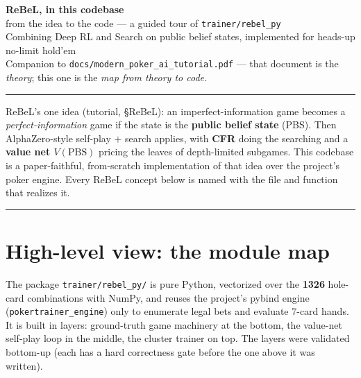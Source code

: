\documentclass[11pt,a4paper]{article}
\newcommand{\file}[1]{\textcolor{accent}{\texttt{#1}}}
\begin{document}
\begin{center}
  {\Huge\bfseries ReBeL, in this codebase}\\[2mm]
  {\large from the idea to the code --- a guided tour of \texttt{trainer/rebel\_py}}\\[3mm]
  {\normalsize Combining Deep RL and Search on public belief states, implemented for
   heads-up no-limit hold'em}\\[2mm]
  {\small Companion to \texttt{docs/modern\_poker\_ai\_tutorial.pdf} --- that document
   is the \emph{theory}; this one is the \emph{map from theory to code}.}
\end{center}
\vspace{2mm}
\hrule
\vspace{3mm}

\begin{intuition}
ReBeL's one idea (tutorial, §ReBeL): an imperfect-information game becomes a
\emph{perfect-information} game if the state is the \textbf{public belief state}
(PBS). Then AlphaZero-style self-play $+$ search applies, with \textbf{CFR}
doing the searching and a \textbf{value net $V(\text{PBS})$} pricing the leaves of
depth-limited subgames. This codebase is a paper-faithful, from-scratch
implementation of that idea over the project's poker engine. Every ReBeL concept
below is named with the file and function that realizes it.
\end{intuition}

\tableofcontents
\vspace{3mm}\hrule

\section{High-level view: the module map}

The package \file{trainer/rebel\_py/} is pure Python, vectorized over the
\textbf{1326} hole-card combinations with NumPy, and reuses the project's pybind
engine (\texttt{pokertrainer\_engine}) only to enumerate legal bets and evaluate
7-card hands. It is built in layers: ground-truth game machinery at the bottom,
the value-net self-play loop in the middle, the cluster trainer on top. The
layers were validated bottom-up (each has a hard correctness gate before the
one above it was written).
\end{document}
